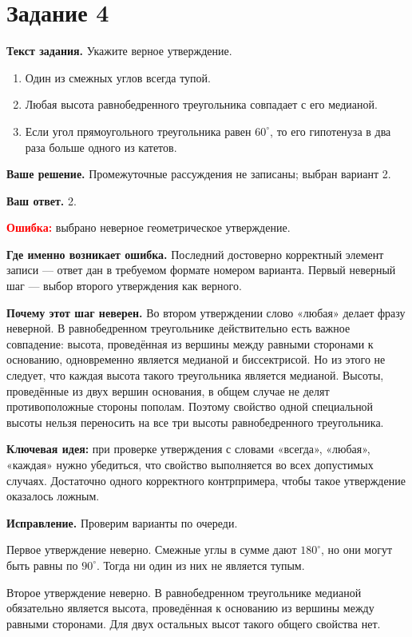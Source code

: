 \documentclass[12pt,a4paper]{article}
\begin{document}
\label{task:4}
\section*{Задание 4}

\textbf{Текст задания.} Укажите верное утверждение.
\begin{enumerate}
  \item Один из смежных углов всегда тупой.
  \item Любая высота равнобедренного треугольника совпадает с его медианой.
  \item Если угол прямоугольного треугольника равен $60^\circ$, то его гипотенуза в два раза больше одного из катетов.
\end{enumerate}

\textbf{Ваше решение.} Промежуточные рассуждения не записаны; выбран вариант 2.

\textbf{Ваш ответ.} 2.

\textcolor{red}{\textbf{Ошибка:}} выбрано неверное геометрическое утверждение.

\textbf{Где именно возникает ошибка.} Последний достоверно корректный элемент записи --- ответ дан в требуемом формате номером варианта. Первый неверный шаг --- выбор второго утверждения как верного.

\textbf{Почему этот шаг неверен.} Во втором утверждении слово «любая» делает фразу неверной. В равнобедренном треугольнике действительно есть важное совпадение: высота, проведённая из вершины между равными сторонами к основанию, одновременно является медианой и биссектрисой. Но из этого не следует, что каждая высота такого треугольника является медианой. Высоты, проведённые из двух вершин основания, в общем случае не делят противоположные стороны пополам. Поэтому свойство одной специальной высоты нельзя переносить на все три высоты равнобедренного треугольника.

\textcolor{blue!60!black}{\textbf{Ключевая идея:}} при проверке утверждения с словами «всегда», «любая», «каждая» нужно убедиться, что свойство выполняется во всех допустимых случаях. Достаточно одного корректного контрпримера, чтобы такое утверждение оказалось ложным.

\textbf{Исправление.} Проверим варианты по очереди.

Первое утверждение неверно. Смежные углы в сумме дают $180^\circ$, но они могут быть равны по $90^\circ$. Тогда ни один из них не является тупым.

Второе утверждение неверно. В равнобедренном треугольнике медианой обязательно является высота, проведённая к основанию из вершины между равными сторонами. Для двух остальных высот такого общего свойства нет.
\end{document}
